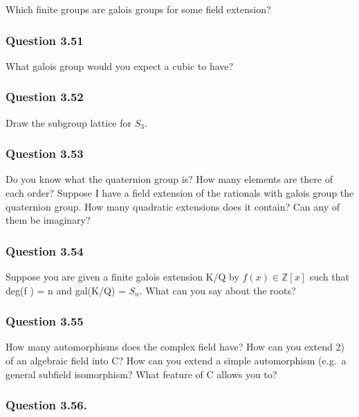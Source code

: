 Which finite groups are galois groups for some field extension?

\hypertarget{question-3.51}{%
\subsubsection{Question 3.51}\label{question-3.51}}

What galois group would you expect a cubic to have?

\hypertarget{question-3.52}{%
\subsubsection{Question 3.52}\label{question-3.52}}

Draw the subgroup lattice for \(S_3\).

\hypertarget{question-3.53}{%
\subsubsection{Question 3.53}\label{question-3.53}}

Do you know what the quaternion group is? How many elements are there of
each order? Suppose I have a field extension of the rationals with
galois group the quaternion group. How many quadratic extensions does it
contain? Can any of them be imaginary?

\hypertarget{question-3.54}{%
\subsubsection{Question 3.54}\label{question-3.54}}

Suppose you are given a finite galois extension K/Q by
\(f (x) \in {\mathbb{Z}}[x]\) such that deg(f ) = n and gal(K/Q) =
\(S_n\). What can you say about the roots?

\hypertarget{question-3.55}{%
\subsubsection{Question 3.55}\label{question-3.55}}

How many automorphisms does the complex field have? How can you extend
2) of an algebraic field into C? How can you extend a simple
automorphism (e.g.~a general subfield isomorphism? What feature of C
allows you to? 

\hypertarget{question-3.56.}{%
\subsubsection{Question 3.56.}\label{question-3.56.}}

